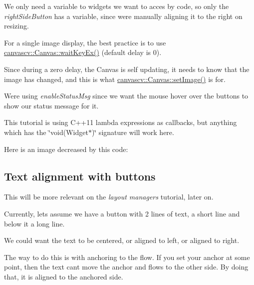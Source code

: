 \begin{DoxyItemize}
\item We only need a variable to widgets we want to acces by code, so only the {\itshape right\+Side\+Button} has a variable, since we\textquotesingle{}re manually aligning it to the right on resizing.
\item For a single image display, the best practice is to use \hyperlink{classcanvascv_1_1Canvas_a59397db05f5d9e45264f626f6a2ae528}{canvascv\+::\+Canvas\+::wait\+Key\+Ex()} (default delay is 0).
\begin{DoxyItemize}
\item Since during a zero delay, the Canvas is self updating, it needs to know that the image has changed, and this is what \hyperlink{classcanvascv_1_1Canvas_a441c5882c7ebebd454a306b3c3478ae7}{canvascv\+::\+Canvas\+::set\+Image()} is for.
\end{DoxyItemize}
\item We\textquotesingle{}re using {\itshape enable\+Status\+Msg} since we want the mouse hover over the buttons to show our status message for it.
\item This tutorial is using C++11 lambda expressions as callbacks, but anything which has the \char`\"{}void(\+Widget$\ast$)\char`\"{} signature will work here.
\item Here is an image decreased by this code\+:  ~\newline

\end{DoxyItemize}\hypertarget{tutbuttons_buttons_s2}{}\subsection{Text alignment with buttons}\label{tutbuttons_buttons_s2}
This will be more relevant on the {\itshape layout managers} tutorial, later on.

Currently, lets assume we have a button with 2 lines of text, a short line and below it a long line.

We could want the text to be centered, or aligned to left, or aligned to right.

The way to do this is with anchoring to the flow. If you set your anchor at some point, then the text can\textquotesingle{}t move the anchor and flows to the other side. By doing that, it is aligned to the anchored side.


